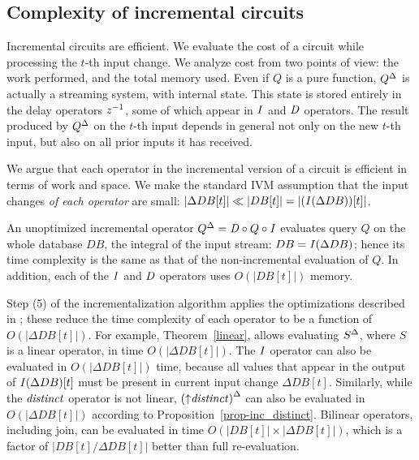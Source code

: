 
\subsection{Complexity of incremental circuits}\label{sec:complexity}

Incremental circuits are efficient.  We evaluate the cost of a circuit
while processing the $t$-th input change.  We analyze cost from two
points of view: the work performed, and the total memory used.  Even
if $Q$ is a pure function, ${Q}^{\Delta}$ is actually a streaming system,
with internal state.  This state is stored entirely in the delay
operators $z^{-1}$, some of which appear in $\mathit{I}$ and $\mathit{D}$ operators.  The
result produced by ${Q}^{\Delta}$ on the $t$-th input depends in general
not only on the new $t$-th input, but also on all prior inputs it has
received.

We argue that each operator in the incremental version of a circuit is
efficient in terms of work and space.  We make the standard IVM
assumption that the input changes \emph{of each operator} are small:
$|\Delta DB[t]| \ll |DB[t]| = |(\mathit{I}(\Delta DB))[t]|$.

An unoptimized incremental operator ${Q}^{\Delta} = \mathit{D} \circ Q \circ \mathit{I}$
evaluates query $Q$ on the whole database $DB$, the integral of the input stream:
$DB = \mathit{I}(\Delta DB)$; hence its time complexity  is the same as that of the non-incremental
evaluation of $Q$.  In addition, each of the $\mathit{I}$ and $\mathit{D}$ operators uses $O(|DB[t]|)$ memory.

Step (5) of the incrementalization algorithm applies the optimizations described in ;
these reduce the time complexity of each operator to be a function of $O(|\Delta DB[t]|)$.
For example, Theorem~\ref{linear}, allows evaluating ${S}^{\Delta}$, where $S$ is a
linear operator, in time $O(|\Delta DB[t]|)$.  The $\mathit{I}$
operator can also be evaluated in $O(|\Delta DB[t]|)$ time, because
all values that appear in the output of $\mathit{I}(\Delta DB)[t]$ must be present in
current input change $\Delta DB[t]$.  Similarly, while the $\mathit{distinct}$ operator is not
linear, ${({\uparrow}\mathit{distinct})}^{\Delta}$ can also be evaluated in $O(|\Delta DB[t]|)$ according to
Proposition~\ref{prop-inc_distinct}.  Bilinear operators, including join, can be
evaluated in time $O(|DB[t]| \times |\Delta DB[t]|)$, which is a factor of $|DB[t] / \Delta DB[t]|$
better than full re-evaluation.

